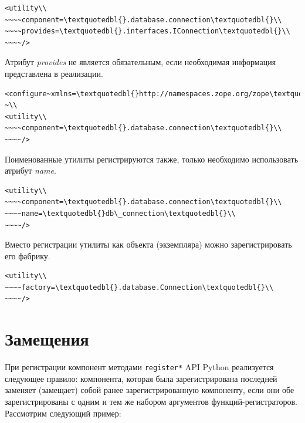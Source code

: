 \documentclass[a4paper,openany,twoside,draft]{book}
\providecommand*{\DUroletitlereference}[1]{\textsl{#1}}
\begin{document}
\begin{verbatim}
<utility\\
~~~~component=\textquotedbl{}.database.connection\textquotedbl{}\\
~~~~provides=\textquotedbl{}.interfaces.IConnection\textquotedbl{}\\
~~~~/>
\end{verbatim}

Атрибут \DUroletitlereference{provides} не является обязательным, если необходимая
информация представлена в реализации.

\begin{verbatim}
<configure~xmlns=\textquotedbl{}http://namespaces.zope.org/zope\textquotedbl{}>\\
~\\
<utility\\
~~~~component=\textquotedbl{}.database.connection\textquotedbl{}\\
~~~~/>
\end{verbatim}

Поименованные утилиты регистрируются также, только необходимо
использовать атрибут \DUroletitlereference{name}.

\begin{verbatim}
<utility\\
~~~~component=\textquotedbl{}.database.connection\textquotedbl{}\\
~~~~name=\textquotedbl{}db\_connection\textquotedbl{}\\
~~~~/>
\end{verbatim}

Вместо регистрации утилиты как объекта (экземпляра) можно
зарегистрировать его фабрику.

\begin{verbatim}
<utility\\
~~~~factory=\textquotedbl{}.database.Connection\textquotedbl{}\\
~~~~/>
\end{verbatim}


\section{Замещения%
  \label{id48}%
}

При регистрации компонент методами \texttt{register*} API Python
реализуется следующее правило: компонента, которая была
зарегистрирована последней заменяет (замещает) собой ранее зарегистрированную
компоненту, если они обе зарегистрированы с одним и тем же набором
аргументов функций-регистраторов.  Рассмотрим следующий пример:
\end{document}
